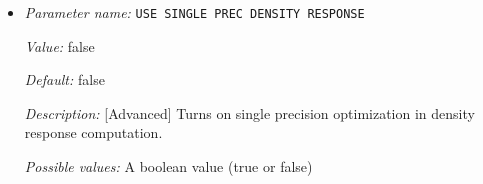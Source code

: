\begin{itemize}
{\it Possible values:} A floating point number $v$ such that $0 \leq v \leq 10$
\item {\it Parameter name:} {\tt USE SINGLE PREC DENSITY RESPONSE}
\label{parameters:SCF parameters/LOW RANK DIELECM PRECOND/USE SINGLE PREC DENSITY RESPONSE}
\label{parameters:SCF_20parameters/LOW_20RANK_20DIELECM_20PRECOND/USE_20SINGLE_20PREC_20DENSITY_20RESPONSE}


{\it Value:} false


{\it Default:} false


{\it Description:} [Advanced] Turns on single precision optimization in density response computation.


{\it Possible values:} A boolean value (true or false)
\end{itemize}
